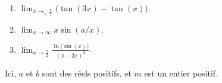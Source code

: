 \begin{exercice}
\begin{multicols}{2}
\begin{enumerate}
\item
$\lim_{x\to_{<} \frac{ \pi }{ 2 }} \big( \tan(3x)-\tan(x)\big)$.


\item
$\lim_{x\to \infty} x\sin(a/x)$.

\item
$\lim_{x\to \frac{ \pi }{2}} \frac{ \ln\big( \sin(x) \big) }{ (\pi-2x)^2 }$.

\end{enumerate}
\end{multicols}
Ici, $a$ et $b$ sont des réels positifs, et $m$ est un entier positif.


\end{exercice}
